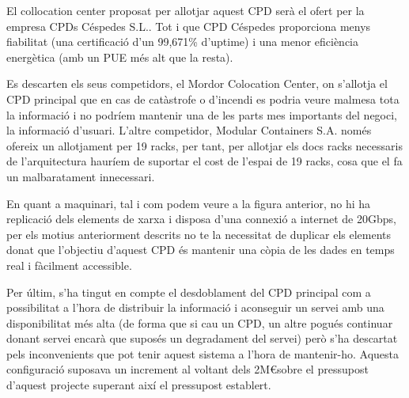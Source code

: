 El collocation center proposat per allotjar aquest CPD serà el ofert per la empresa CPDs Céspedes S.L.. Tot i que CPD Céspedes proporciona menys fiabilitat (una certificació d’un 99,671\% d'uptime) i una menor eficiència energètica (amb un PUE més alt que la resta).

Es descarten els seus competidors, el Mordor Colocation Center, on s’allotja el CPD principal que en cas de catàstrofe o d’incendi es podria veure malmesa tota la informació i no podríem mantenir una de les parts mes importants del negoci, la informació d’usuari. L’altre competidor, Modular Containers S.A. només ofereix un allotjament per 19 racks, per tant, per allotjar els docs racks necessaris de l’arquitectura hauríem de suportar el cost de l’espai de 19 racks, cosa que el fa un malbaratament innecessari.

En quant a maquinari, tal i com podem veure a la figura anterior, no hi ha replicació dels elements de xarxa i disposa d’una connexió a internet de 20Gbps, per els motius anteriorment descrits no te la necessitat de duplicar els elements donat que l’objectiu d’aquest CPD és mantenir una còpia de les dades en temps real i fàcilment accessible.

Per últim, s'ha tingut en compte el desdoblament del CPD principal com a possibilitat a l'hora de distribuir la informació i aconseguir un servei amb una disponibilitat més alta (de forma que si cau un CPD, un altre pogués continuar donant servei encarà que suposés un degradament del servei) però s'ha descartat pels inconvenients que pot tenir aquest sistema a l'hora de mantenir-ho. Aquesta configuració suposava un increment al voltant dels 2M\euro  sobre el pressupost d'aquest projecte superant així el pressupost establert.